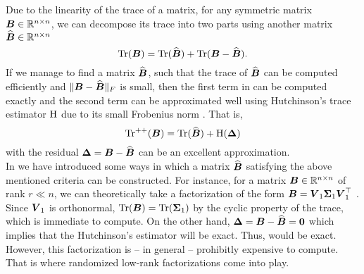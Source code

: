 Due to the linearity of the trace of a matrix, for any symmetric matrix $\boldsymbol{B} \in \mathbb{R}^{n \times n}$, we
can decompose its trace into two parts using another matrix $\widehat{\boldsymbol{B}} \in \mathbb{R}^{n \times n}$
\begin{equation}
    \operatorname{Tr}(\boldsymbol{B}) = \operatorname{Tr}(\widehat{\boldsymbol{B}}) + \operatorname{Tr}(\boldsymbol{B} - \widehat{\boldsymbol{B}}).
    \label{equ:4-nystromchebyshev-trace-decomposition}
\end{equation}
If we manage to find a matrix $\widehat{\boldsymbol{B}}$, such that the trace of
$\widehat{\boldsymbol{B}}$ can be computed efficiently and
$\lVert \boldsymbol{B} - \widehat{\boldsymbol{B}} \rVert _F$ is small,
then the first term in  can
be computed exactly and the second term can be approximated well using Hutchinson's
trace estimator $\operatorname{H}$ 
due to its small Frobenius norm .
That is,
\begin{equation}
    \operatorname{Tr}^{++}(\boldsymbol{B}) = \operatorname{Tr}(\widehat{\boldsymbol{B}}) + \operatorname{H}(\boldsymbol{\Delta})
    \label{equ:4-nystromchebyshev-hutch-pp}
\end{equation}
with the residual $\boldsymbol{\Delta} = \boldsymbol{B} - \widehat{\boldsymbol{B}}$ can be an excellent
approximation.\\

In  we have introduced
some ways in which a matrix $\widehat{\boldsymbol{B}}$ satisfying the above mentioned
criteria can be constructed. For instance, for a matrix $\boldsymbol{B} \in \mathbb{R}^{n \times n}$
of rank $r \ll n$, we can theoretically take a factorization of the form
$\boldsymbol{B} = \boldsymbol{V}_1 \boldsymbol{\Sigma}_1 \boldsymbol{V}_1^{\top}$ .
Since $\boldsymbol{V}_1$ is orthonormal, $\operatorname{Tr}(\boldsymbol{B}) = \operatorname{Tr}(\boldsymbol{\Sigma}_1)$ by the
cyclic property of the trace, which is immediate to compute. On the other hand,
$\boldsymbol{\Delta} = \boldsymbol{B} - \widehat{\boldsymbol{B}} = \boldsymbol{0}$ which implies that the
Hutchinson's estimator will be exact. Thus, 
would be exact. However, this factorization is -- in general -- prohibitly expensive
to compute. That is where randomized low-rank factorizations come into play.\\

